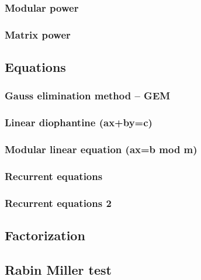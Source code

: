 \documentclass[a4paper]{article}
\begin{document}
\begin{multicols*}{3}
        \subsubsection{Modular power}
            
            
        \subsubsection{Matrix power}
            
    \subsection{Equations}
        \subsubsection{Gauss elimination method -- GEM}
            
        \subsubsection{Linear diophantine (ax+by=c)}
            
        \subsubsection{Modular linear equation (ax=b mod m)}
            
        \subsubsection{Recurrent equations}
            
        \subsubsection{Recurrent equations 2}
            
    \subsection{Factorization}
        
    \subsection{Rabin Miller test}
        

\end{multicols*}
\end{document}
